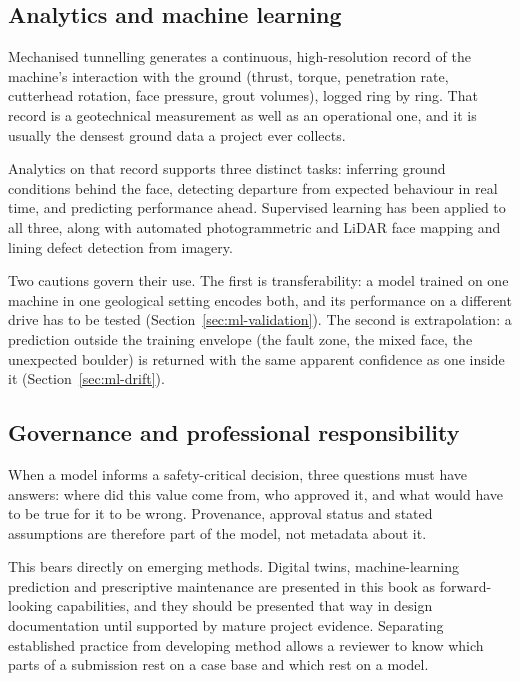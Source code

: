 \subsection{Analytics and machine learning}
\label{sec:analytics}

Mechanised tunnelling generates a continuous, high-resolution record of the
machine's interaction with the ground (thrust, torque, penetration rate,
cutterhead rotation, face pressure, grout volumes), logged ring by ring. That
record is a geotechnical measurement as well as an operational one, and it is
usually the densest ground data a project ever collects.

Analytics on that record supports three distinct tasks: inferring ground
conditions behind the face, detecting departure from expected behaviour in
real time, and predicting performance ahead. Supervised learning has been
applied to all three, along with automated photogrammetric and LiDAR face
mapping and lining defect detection from imagery.

Two cautions govern their use. The first is transferability: a model trained
on one machine in one geological setting encodes both, and its performance on
a different drive has to be tested (Section~\ref{sec:ml-validation}). The
second is extrapolation: a prediction outside the training envelope (the fault
zone, the mixed face, the unexpected boulder) is returned with the same
apparent confidence as one inside it (Section~\ref{sec:ml-drift}).

\subsection{Governance and professional responsibility}
\label{sec:data-governance}

When a model informs a safety-critical decision, three questions must have
answers: where did this value come from, who approved it, and what would have
to be true for it to be wrong. Provenance, approval status and stated
assumptions are therefore part of the model, not metadata about it.

This bears directly on emerging methods. Digital twins, machine-learning
prediction and prescriptive maintenance are presented in this book as
forward-looking capabilities, and they should be presented that way in design
documentation until supported by mature project evidence. Separating
established practice from developing method
allows a reviewer to know which parts of a submission rest on a case base and
which rest on a model.

